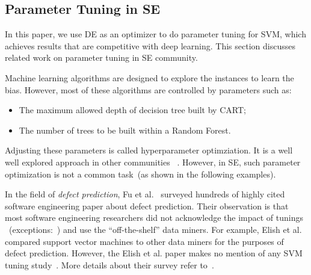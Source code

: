 \documentclass[sigconf]{acmart}
\theoremstyle{break}
\newcommand{\bi}{\begin{itemize}[leftmargin=0.4cm]}
\newcommand{\ei}{\end{itemize}}
\begin{document}




\subsection{Parameter Tuning in SE}\label{tuning}
In this paper, we use DE as an optimizer to do parameter tuning for SVM, which
achieves results that are competitive with deep learning. This section
discusses related work on parameter tuning in SE community.


Machine learning algorithms are designed to explore the instances
to learn the bias. However, most of these algorithms are controlled by parameters
such as:


\bi
\item
The maximum allowed depth
of decision tree built by CART;
\item
The number of trees to be built within a Random Forest.
\ei



Adjusting these parameters
is called hyperparameter optimziation.
It is a well   well explored approach in other communities ~\cite{bergstra2012random,li2016hyperband}. However, in SE,
such parameter optimization is not a common task~(as shown in the following examples).





In the field of {\em defect prediction}, 
Fu et al.~\cite{fu2016tuning}  surveyed hundreds of highly 
cited software engineering paper about defect prediction. 
Their observation is that most software engineering  researchers
did not acknowledge the impact of tunings 
~(exceptions:~\cite{lessmann2008benchmarking,tantithamthavorn2016automated}) and
use the ``off-the-shelf'' data miners. For example, 
Elish et al.~\cite{elish2008predicting} compared support vector machines
to other data miners for the purposes of defect prediction.
However, the Elish et al. paper makes no mention of any SVM tuning study~\cite{elish2008predicting}. More details about their survey 
refer to~\cite{fu2016tuning}.
\end{document}
